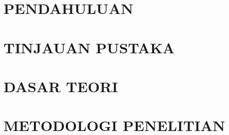 \documentclass[ugmtesis]{ugmtesis}
\begin{document}
\newpage
{}
{}
\printglossary[type=main, title=DAFTAR ISTILAH]

\newpage
{}
{}
\printglossary[type=\acronymtype, title=DAFTAR SINGKATAN]

\begin{abstractind}
	
\end{abstractind}

\chapter{PENDAHULUAN}
\label{PENDAHULUAN}


\chapter{TINJAUAN PUSTAKA}
\label{TINJAUAN PUSTAKA}


\chapter{DASAR TEORI}
\label{DASAR TEORI}


\chapter{METODOLOGI PENELITIAN}
\label{ANALISIS DAN PERANCANGAN SISTEM}

\end{document}

